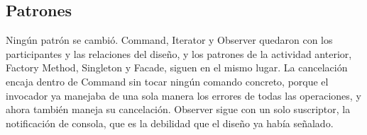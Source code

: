 \subsection{Patrones}

Ningún patrón se cambió. Command, Iterator y Observer quedaron con los participantes y las relaciones del diseño, y los patrones de la actividad anterior, Factory Method, Singleton y Facade, siguen en el mismo lugar. La cancelación encaja dentro de Command sin tocar ningún comando concreto, porque el invocador ya manejaba de una sola manera los errores de todas las operaciones, y ahora también maneja su cancelación. Observer sigue con un solo suscriptor, la notificación de consola, que es la debilidad que el diseño ya había señalado.
